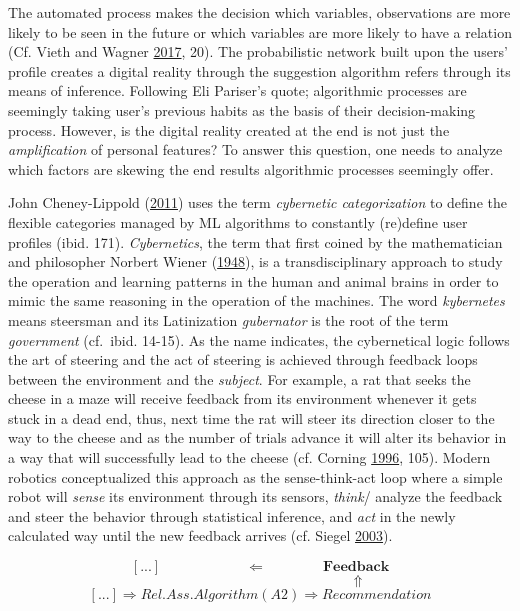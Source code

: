 \documentclass[12pt,twoside]{report}
\begin{document}
The automated process makes the decision which variables, observations are more likely to be seen in the future or which variables are more likely to have a relation (Cf. Vieth and Wagner \protect\hyperlink{ref-Vieth2017}{2017}, 20). The probabilistic network built upon the users' profile creates a digital reality through the suggestion algorithm refers through its means of inference. Following Eli Pariser's quote; algorithmic processes are seemingly taking user's previous habits as the basis of their decision-making process. However, is the digital reality created at the end is not just the \emph{amplification} of personal features? To answer this question, one needs to analyze which factors are skewing the end results algorithmic processes seemingly offer.

John Cheney-Lippold (\protect\hyperlink{ref-Cheney2011}{2011}) uses the term \emph{cybernetic categorization} to define the flexible categories managed by ML algorithms to constantly (re)define user profiles (ibid. 171). \emph{Cybernetics}, the term that first coined by the mathematician and philosopher Norbert Wiener (\protect\hyperlink{ref-Wiener1948}{1948}), is a transdisciplinary approach to study the operation and learning patterns in the human and animal brains in order to mimic the same reasoning in the operation of the machines. The word \emph{kybernetes} means steersman and its Latinization \emph{gubernator} is the root of the term \emph{government} (cf.~ibid. 14-15). As the name indicates, the cybernetical logic follows the art of steering and the act of steering is achieved through feedback loops between the environment and the \emph{subject}. For example, a rat that seeks the cheese in a maze will receive feedback from its environment whenever it gets stuck in a dead end, thus, next time the rat will steer its direction closer to the way to the cheese and as the number of trials advance it will alter its behavior in a way that will successfully lead to the cheese (cf. Corning \protect\hyperlink{ref-Corning1996}{1996}, 105). Modern robotics conceptualized this approach as the sense-think-act loop where a simple robot will \emph{sense} its environment through its sensors, \emph{think}/ analyze the feedback and steer the behavior through statistical inference, and \emph{act} in the newly calculated way until the new feedback arrives (cf. Siegel \protect\hyperlink{ref-Siegel2003}{2003}).

\[[...] \qquad \qquad \qquad \Leftarrow   \qquad \qquad   \textbf{Feedback} \]
\[    \qquad  \qquad \qquad \qquad \qquad \qquad \qquad \Uparrow \]
\[ [...]\Rightarrow Rel. Ass. Algorithm (A2) \Rightarrow Recommendation\]
\end{document}
